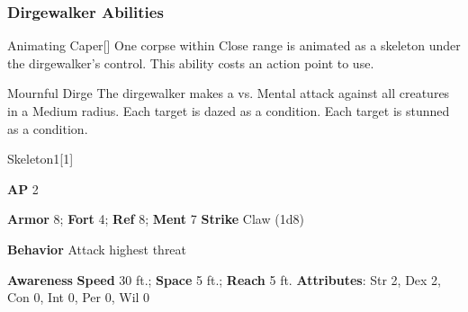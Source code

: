 \subsubsection{Dirgewalker Abilities}

\begin{ability}{Animating Caper}[]
One corpse within Close range is animated as a skeleton under the dirgewalker's control.
This ability costs an action point to use.
\end{ability}

\vspace{0.5em}
\begin{ability}{Mournful Dirge}
The dirgewalker makes a  vs. Mental attack against all creatures in a Medium radius.
\hit Each target is dazed as a condition.
\crit Each target is stunned as a condition.
\end{ability}

\begin{monsection}{Skeleton}{1}[1]
\vspace{-1em}\vspace{-1em}
\begin{spellcontent}
\begin{spelltargetinginfo}
{\textbf{AP} 2}

\pari \textbf{Armor} 8;
\textbf{Fort} 4;
\textbf{Ref} 8;
\textbf{Ment} 7
\pari \textbf{Strike} Claw  (1d8)



\pari \textbf{Behavior} Attack highest threat
\end{spelltargetinginfo}
\end{spellcontent}

\begin{monsterfooter}
\pari \textbf{Awareness} 
\pari \textbf{Speed} 30 ft.;
\textbf{Space} 5 ft.;
\textbf{Reach} 5 ft.
\pari \textbf{Attributes}:
Str 2,
Dex 2,
Con 0,
Int 0,
Per 0,
Wil 0
\end{monsterfooter}
\end{monsection}

